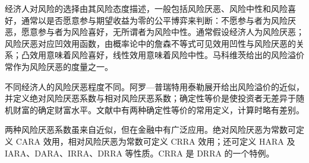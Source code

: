 

\begin{tcolorbox}[summary,title=本章小结]
经济人对风险的选择由其风险态度描述，一般包括风险厌恶、风险中性和风险喜好，通常以是否愿意参与期望收益为零的公平博弈来判断：不愿参与者为风险厌恶，愿意参与者为风险喜好，无所谓者为风险中性。通常假设经济人为风险厌恶；风险厌恶对应凹效用函数，由概率论中的詹森不等式可见效用凹性与风险厌恶的关系；凸效用意味着风险喜好，线性效用意味着风险中性。马科维茨给出的风险溢价常作为风险厌恶的度量之一。

不同经济人的风险厌恶程度不同。阿罗—普瑞特用泰勒展开给出风险溢价的近似，并定义绝对风险厌恶系数与相对风险厌恶系数；确定性等价是使投资者无差异于随机财富的确定财富水平。文献中有两种确定性等价的常用定义，计算时略有差别。

两种风险厌恶系数虽来自近似，但在金融中有广泛应用。绝对风险厌恶为常数可定义 CARA 效用，相对风险厌恶为常数可定义 CRRA 效用；还可定义 HARA 及 IARA、DARA、IRRA、DRRA 等性质。CRRA 是 DRRA 的一个特例。
\end{tcolorbox}



